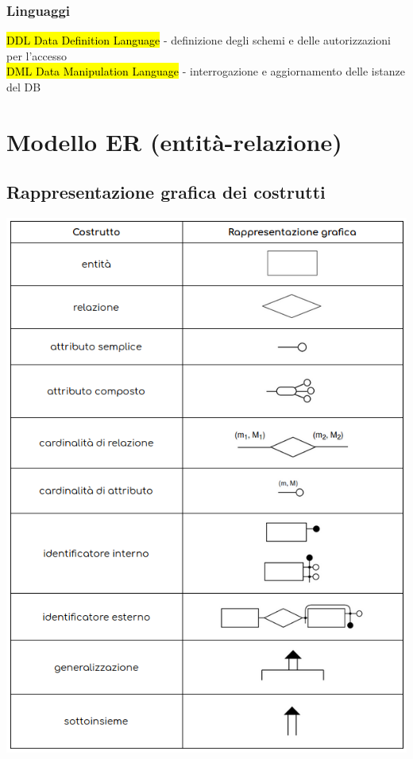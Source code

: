 \documentclass[a4paper]{article}
\begin{document}
\subsubsection{Linguaggi}
\hl{DDL Data Definition Language} - definizione degli schemi e delle autorizzazioni per l’accesso\\
\hl{DML Data Manipulation Language} - interrogazione e aggiornamento delle istanze del DB

\section{Modello ER (entità-relazione)}
\subsection{Rappresentazione grafica dei costrutti}
\begin{center}
      \includegraphics[scale=0.6]{img/er1.png}
\end{center}
\end{document}
